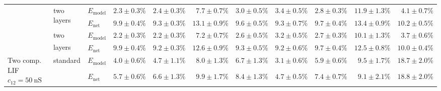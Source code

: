 \begin{sidewaystable}
\begin{tabular}{p{2.2cm} p{1.7cm} l r r r r r r r r }
	\\\cmidrule(l){2-11}
	&
	\multirow{2}{1.7cm}{\raggedleft two layers} &
	$E_\mathrm{model}$ & 
	\color{Gray}$2.3 \pm 0.3\%$ & \color{Gray}$2.4 \pm 0.3\%$ & \color{Gray}$7.7 \pm 0.7\%$ & \color{Gray}$3.0 \pm 0.5\%$ & \color{Gray}$3.4 \pm 0.5\%$ & \color{Gray}$2.8 \pm 0.3\%$ & \color{Gray}$11.9 \pm 1.3\%$ & \color{Gray}$4.1 \pm 0.7\%$
	\\
	& & 
	$E_\mathrm{net}$ &
	\cellcolor{White!19!SteelBlue}$9.9 \pm 0.4\%$ & \cellcolor{White!32!SteelBlue}$9.3 \pm 0.3\%$ & \cellcolor{White!19!SteelBlue}$13.1 \pm 0.9\%$ & \cellcolor{White!50!SteelBlue}$9.6 \pm 0.5\%$ & \cellcolor{White!57!SteelBlue}$9.3 \pm 0.7\%$ & \cellcolor{White!50!SteelBlue}$9.7 \pm 0.4\%$ & \cellcolor{White!13!SteelBlue}$13.4 \pm 0.9\%$ & \cellcolor{White!88!SteelBlue}$10.2 \pm 0.5\%$
	\\\cmidrule(l){2-11}
	&
	\multirow{2}{1.7cm}{\raggedleft two layers\textsuperscript{\dag}} &
	$E_\mathrm{model}$ & 
	\color{Gray}$2.2 \pm 0.3\%$ & \color{Gray}$2.2 \pm 0.3\%$ & \color{Gray}$7.2 \pm 0.7\%$ & \color{Gray}$2.6 \pm 0.5\%$ & \color{Gray}$3.2 \pm 0.5\%$ & \color{Gray}$2.7 \pm 0.3\%$ & \color{Gray}$10.1 \pm 1.3\%$ & \color{Gray}$\mathbf{3.7 \pm 0.6\%}$
	\\
	& & 
	$E_\mathrm{net}$ &
	\cellcolor{White!25!SteelBlue}$9.9 \pm 0.4\%$ & \cellcolor{White!38!SteelBlue}$9.2 \pm 0.3\%$ & \cellcolor{White!25!SteelBlue}$12.6 \pm 0.9\%$ & \cellcolor{White!63!SteelBlue}$9.3 \pm 0.5\%$ & \cellcolor{White!63!SteelBlue}$9.2 \pm 0.6\%$ & \cellcolor{White!44!SteelBlue}$9.7 \pm 0.4\%$ & \cellcolor{White!19!SteelBlue}$12.5 \pm 0.8\%$ & \cellcolor{White!94!SteelBlue}$10.0 \pm 0.4\%$
	\\\midrule
	\multirow{8}{2.2cm}{\raggedleft %
	Two comp. LIF $c_{12} = \SI{50}{\nano\siemens}$} &
	\multirow{2}{1.7cm}{\raggedleft %
	standard} &
	$E_\mathrm{model}$ & 
	\color{Gray}$4.0 \pm 0.6\%$ & \color{Gray}$4.7 \pm 1.1\%$ & \color{Gray}$8.0 \pm 1.3\%$ & \color{Gray}$6.7 \pm 1.3\%$ & \color{Gray}$3.1 \pm 0.6\%$ & \color{Gray}$5.9 \pm 0.6\%$ & \color{Gray}$9.5 \pm 1.7\%$ & \color{Gray}$18.7 \pm 2.0\%$
	\\
	& & 
	$E_\mathrm{net}$ &
	\cellcolor{White!82!SteelBlue}$5.7 \pm 0.6\%$ & \cellcolor{White!75!SteelBlue}$6.6 \pm 1.3\%$ & \cellcolor{White!44!SteelBlue}$9.9 \pm 1.7\%$ & \cellcolor{White!75!SteelBlue}$8.4 \pm 1.3\%$ & \cellcolor{White!94!SteelBlue}$4.7 \pm 0.5\%$ & \cellcolor{White!75!SteelBlue}$7.4 \pm 0.7\%$ & \cellcolor{White!63!SteelBlue}$9.1 \pm 2.1\%$ & \cellcolor{White!38!SteelBlue}$18.8 \pm 2.0\%$
	\\\cmidrule(l){2-11}

\end{tabular}
\end{sidewaystable}
